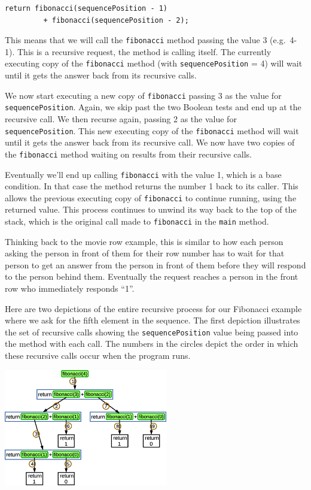 \beforeverb
\begin{verbatim}
return fibonacci(sequencePosition - 1) 
         + fibonacci(sequencePosition - 2);
\end{verbatim}
\afterverb

This means that we will call the \texttt{fibonacci} method passing the value 3 \mbox{(e.g. 4-1)}. This is a recursive request, the method is calling itself. The currently executing copy of the \texttt{fibonacci} method (with \texttt{sequencePosition} = 4) will wait until it gets the answer back from its recursive calls.

We now start executing a new copy of \texttt{fibonacci} passing 3 as the value for \texttt{sequencePosition}. Again, we skip past the two Boolean tests and end up at the recursive call. We then recurse again, passing 2 as the value for \texttt{sequencePosition}. This new executing copy of the \texttt{fibonacci} method will wait until it gets the answer back from its recursive call. We now have two copies of the \texttt{fibonacci} method waiting on results from their recursive calls.

Eventually we'll end up calling \texttt{fibonacci} with the value 1, which is a base condition. In that case the method returns the number 1 back to its caller. This allows the previous executing copy of \texttt{fibonacci} to continue running, using the returned value. This process continues to unwind its way back to the top of the stack, which is the original call made to \texttt{fibonacci} in the \texttt{main} method.

Thinking back to the movie row example, this is similar to how each person asking the person in front of them for their row number has to wait for that person to get an answer from the person in front of them before they will respond to the person behind them. Eventually the request reaches a person in the front row who immediately responds ``1''.

\pagebreak

Here are two depictions of the entire recursive process for our Fibonacci example where we ask for the fifth element in the sequence. The first depiction illustrates the set of recursive calls showing the \texttt{sequencePosition} value being passed into the method with each call. The numbers in the circles depict the order in which these recursive calls occur when the program runs.

\beforefig
\centerline{\includegraphics[height=2in]{figs2/recursion-fibonacci-depiction-0.eps}}
\afterfig

